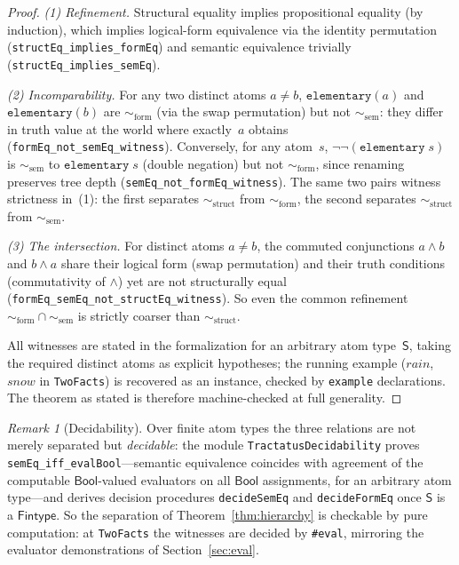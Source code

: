\documentclass[jsl,bibother]{asl}
\theoremstyle{definition}
\theoremstyle{remark}
\newtheorem{remark}[theorem]{Remark}
\newcommand{\Sach}{\mathsf{S}}
\newcommand{\structEq}{\sim_{\mathrm{struct}}}
\newcommand{\formEq}{\sim_{\mathrm{form}}}
\newcommand{\semEq}{\sim_{\mathrm{sem}}}
\begin{document}
\begin{proof}
\emph{(1) Refinement.}  Structural equality implies propositional
equality (by induction), which implies logical-form equivalence
via the identity permutation
(\texttt{structEq\_implies\_formEq}) and semantic equivalence
trivially (\texttt{structEq\_implies\_semEq}).

\emph{(2) Incomparability.}
For any two distinct atoms $a \neq b$,
$\mathtt{elementary}(a)$ and $\mathtt{elementary}(b)$ are
$\formEq$ (via the swap permutation) but not $\semEq$: they
differ in truth value at the world where exactly~$a$ obtains
(\texttt{formEq\_not\_\allowbreak{}semEq\_\allowbreak{}witness}).  Conversely,
for any atom~$s$, $\lnot\lnot(\mathtt{elementary}\;s)$ is
$\semEq$ to $\mathtt{elementary}\;s$ (double negation) but not
$\formEq$, since renaming preserves tree depth
(\texttt{semEq\_not\_formEq\_witness}).  The same two pairs
witness strictness in~(1): the first separates $\structEq$ from
$\formEq$, the second separates $\structEq$ from $\semEq$.

\emph{(3) The intersection.}  For distinct atoms $a \neq b$,
the commuted conjunctions $a \wedge b$ and $b \wedge a$ share
their logical form (swap permutation) and their truth conditions
(commutativity of $\wedge$) yet are not structurally equal
(\texttt{formEq\_\allowbreak{}semEq\_\allowbreak{}not\_\allowbreak{}structEq\_\allowbreak{}witness}).  So even
the common refinement $\formEq \cap \semEq$ is strictly
coarser than $\structEq$.

All witnesses are stated in the formalization for an arbitrary
atom type~$\Sach$, taking the required distinct atoms as
explicit hypotheses; the running example
($\mathit{rain}$, $\mathit{snow}$ in \texttt{TwoFacts}) is
recovered as an instance, checked by \texttt{example}
declarations.  The theorem as stated is therefore machine-checked
at full generality.
\end{proof}

\begin{remark}[Decidability]
\label{rem:decidability}
Over finite atom types the three relations are not merely
separated but \emph{decidable}: the module
\texttt{TractatusDecidability} proves
\texttt{semEq\_iff\_evalBool}---semantic equivalence coincides
with agreement of the computable $\mathsf{Bool}$-valued
evaluators on all $\mathsf{Bool}$ assignments, for an arbitrary
atom type---and derives decision procedures
\texttt{decideSemEq} and \texttt{decideFormEq} once $\Sach$ is a
$\mathsf{Fintype}$.  So the separation of
Theorem~\ref{thm:hierarchy} is checkable by pure computation: at
\texttt{TwoFacts} the witnesses are decided by \texttt{\#eval},
mirroring the evaluator demonstrations of
Section~\ref{sec:eval}.
\end{remark}
\end{document}
